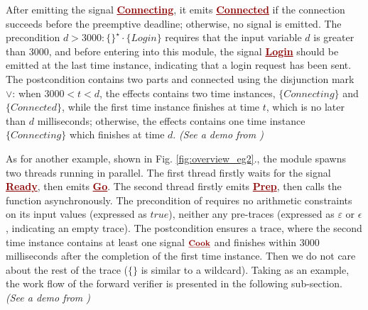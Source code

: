 \documentclass[acmsmall,review,anonymous]{acmart}\settopmatter{printfolios=true,printccs=false,printacmref=false}
\newcommand{\anyevent}[1]{{\textcolor{darkred}
{\underline{\textbf{\footnotesize #1}}}}}
\newcommand{\code}[1]{{\tt{\ensuremath{\m{#1}}}}}
\newcommand{\m}{\mathit}
\newcommand\figref[1]{Fig. \textcolor{black}{\ref{#1}}.}
\begin{document}
After emitting the signal \anyevent{Connecting}, it emits  \anyevent{Connected} if the connection succeeds before the  preemptive deadline; otherwise, no signal is emitted. 
The precondition \code{d{>}3000 : \{
\}^\star \cdot\{\m{Login}\} } requires that the input variable \code{d} is greater than 3000, and before entering into this module, the signal \anyevent{Login} should be emitted at the last time instance, indicating that a login request has been sent. 
The postcondition contains two parts and connected using the disjunction mark \code{{\vee}}: when \code{3000{<}t{<}d}, the effects contains two time instances, \code{\{\m{Connecting}\}} and \code{\{\m{Connected}\}}, while the first  time instance finishes at time \code{t}, %
which is no later than \code{\m{d}} milliseconds; otherwise, the effects contains one time instance \code{\{Connecting\}} which finishes at time \code{d}. \emph{(See a demo from \cite{CODE1})}



As for another example, shown in \figref{fig:overview_eg2}, the module {} %
spawns two threads running in  parallel.
The first thread firstly waits for the signal \anyevent{Ready}, then emits  \anyevent{Go}. 
The second thread firstly emits  \anyevent{Prep}, then calls the function {} asynchronously. 
The precondition of {} requires no arithmetic constraints on its input values (expressed as \code{\m{true}}), neither any pre-traces  (expressed as \code{\m{ε}} or \code{\epsilon}, indicating an empty trace). The postcondition ensures a trace, where the second time instance contains at least one signal \code{\anyevent{Cook}} and finishes within 3000 milliseconds after the completion of the first time instance. Then we do not care about the rest of the trace (\code{\{\}} is similar to a wildcard). 
Taking {} as an example, the work flow of the forward verifier is presented in the following sub-section. \emph{(See a demo from \cite{CODE2})}
\end{document}
